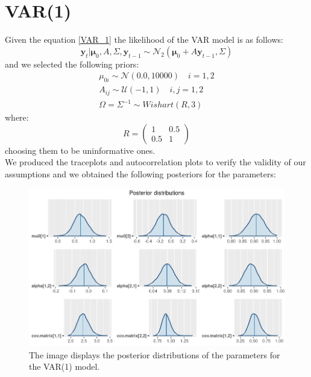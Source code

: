 \section*{VAR(1)}
Given the equation \ref{VAR_1} the likelihood of the VAR model is as follows:
\begin{equation}
    \mathbf{y}_{t}|\mathbf{\mu}_{0}, A, \Sigma, \mathbf{y}_{t-1} \sim \mathcal{N}_2(\mathbf{\mu}_{0} + A \mathbf{y}_{t-1}, \Sigma)
\end{equation}
and we selected the following priors:
\begin{equation}
    \begin{split}
        \mu_{0i} \sim \mathcal{N}(0.0, 10000) \quad i = 1, 2\\
        A_{ij} \sim \mathcal{U}(-1, 1) \quad i,j = 1, 2 \\
        \Omega = \Sigma^{-1} \sim Wishart(R, 3)
    \end{split}
\end{equation}
where:
\begin{equation}
    R = 
    \begin{pmatrix}
        1 & 0.5 \\
        0.5 & 1
    \end{pmatrix}
\end{equation}
choosing them to be uninformative ones. \\
We produced the traceplots and autocorrelation plots to verify the validity of our assumptions and we obtained the following posteriors for the parameters: \\
\begin{figure}[h]
    \centering
    \includegraphics[width=\textwidth]{images/6-VAR/posteriors.png}
    \caption{The image displays the posterior distributions of the parameters for the VAR(1) model.}
    \label{fig:VAR_posteriors}
\end{figure} \\
